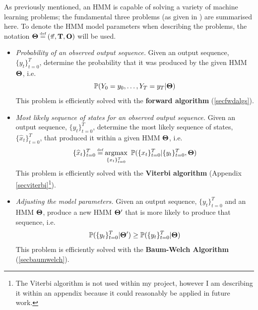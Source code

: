 \documentclass[12pt,a4paper,twoside,openright]{report}
\newcommand\myeq{\stackrel{\mathclap{\tiny\mbox{def}}}{=}}
\newcommand\Prob{\mathbb{P}}
\newcommand{\argmax}{\operatornamewithlimits{argmax}}
\begin{document}
As previously mentioned, an HMM is capable of solving a variety of machine learning problems; the fundamental three problems (as given in \cite{ferguson1980hidden}) are summarised here. To denote the HMM model parameters when describing the problems, the notation \linebreak${\bf \Theta} \myeq (\vec{\pi}, {\bf T}, {\bf O})$ will be used.
\begin{itemize}
	\item \emph{Probability of an observed output sequence.} Given an output sequence, $\{y_t\}_{t=0}^{T}$, determine the probability that it was produced by the given HMM ${\bf \Theta}$, i.e. \begin{equation}\Prob(Y_0 = y_0,\dots,Y_T = y_T | {\bf \Theta})\end{equation}
		This problem is efficiently solved with the \textbf{forward algorithm} (\cref{secfwdalgs}).
	\item \emph{Most likely sequence of states for an observed output sequence.} Given an output sequence, $\{y_t\}_{t=0}^{T}$, determine the most likely sequence of states, $\{\widehat{x}_t\}_{t=0}^{T}$, that produced it within a given HMM ${\bf \Theta}$, i.e. \begin{equation}\{\widehat{x}_t\}_{t=0}^{T} \myeq \argmax_{\{x_t\}_{t=0}^{T}}{\ \Prob(\{x_t\}_{t=0}^{T}|\{y_t\}_{t=0}^{T}, {\bf \Theta})}\end{equation}
		This problem is efficiently solved with the \textbf{Viterbi algorithm} \cite{viterbi1967error} (Appendix \ref{secviterbi}\footnote{The Viterbi algorithm is not used within my project, however I am describing it within an appendix because it could reasonably be applied in future work.}).
	\item \emph{Adjusting the model parameters.} Given an output sequence, $\{y_t\}_{t=0}^{T}$ and an HMM ${\bf \Theta}$, produce a new HMM ${\bf \Theta'}$ that is more likely to produce that sequence, i.e. \begin{equation}\Prob(\{y_t\}_{t=0}^{T}|{\bf \Theta'}) \geq \Prob(\{y_t\}_{t=0}^{T}|{\bf \Theta})\end{equation}
		This problem is efficiently solved with the \textbf{Baum-Welch Algorithm} (\cref{secbaumwelch}).
\end{itemize}

\end{document}
